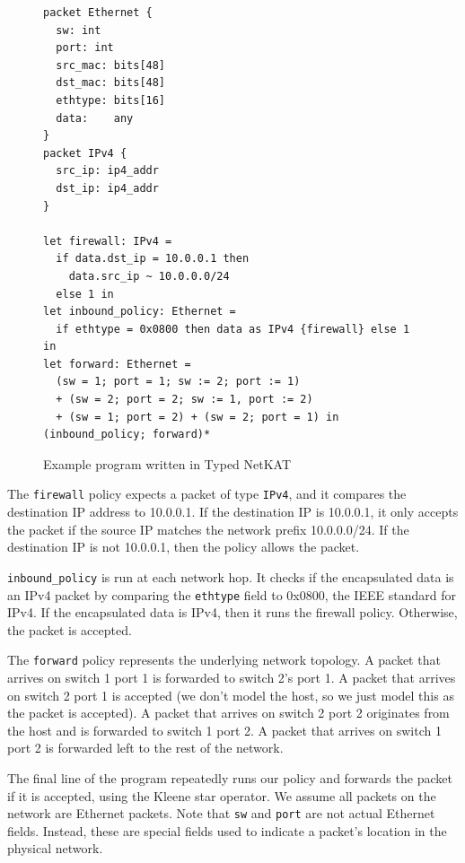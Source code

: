 \documentclass[acmsmall,screen,nonacm]{acmart}
\begin{document}
\begin{figure}
\begin{verbatim}
packet Ethernet {
  sw: int
  port: int
  src_mac: bits[48]
  dst_mac: bits[48]
  ethtype: bits[16]
  data:    any
}
packet IPv4 {
  src_ip: ip4_addr
  dst_ip: ip4_addr
}

let firewall: IPv4 = 
  if data.dst_ip = 10.0.0.1 then
    data.src_ip ~ 10.0.0.0/24
  else 1 in
let inbound_policy: Ethernet =
  if ethtype = 0x0800 then data as IPv4 {firewall} else 1 in
let forward: Ethernet = 
  (sw = 1; port = 1; sw := 2; port := 1)
  + (sw = 2; port = 2; sw := 1, port := 2)
  + (sw = 1; port = 2) + (sw = 2; port = 1) in
(inbound_policy; forward)*
\end{verbatim}

\caption{Example program written in Typed NetKAT}
\label{sample_program}
\end{figure}

The \texttt{firewall} policy expects a packet of type \texttt{IPv4},
and it compares the destination IP address to 10.0.0.1. If the
destination IP is 10.0.0.1, it only accepts the packet if the
source IP matches the network prefix 10.0.0.0/24. If the 
destination IP is not 10.0.0.1, then the policy allows the packet.

\texttt{inbound\_policy} is run at each network hop. It checks if
the encapsulated data is an IPv4 packet by comparing the \texttt{ethtype}
field to 0x0800, the IEEE standard for IPv4. If the encapsulated
data is IPv4, then it runs the firewall policy. Otherwise, the packet
is accepted.

The \texttt{forward} policy represents the underlying network topology.
A packet that arrives on switch 1 port 1 is forwarded to switch 2's port 1.
A packet that arrives on switch 2 port 1 is accepted (we don't model the host,
so we just model this as the packet is accepted). A packet that arrives on
switch 2 port 2 originates from the host and is forwarded to switch 1 port 2.
A packet that arrives on switch 1 port 2 is forwarded left to the rest of the
network.

The final line of the program repeatedly runs our policy and forwards the
packet if it is accepted, using the Kleene star operator. We assume all
packets on the network are Ethernet packets. Note that \texttt{sw} and
\texttt{port} are not actual Ethernet fields. Instead, these are special
fields used to indicate a packet's location in the physical network.
\end{document}
